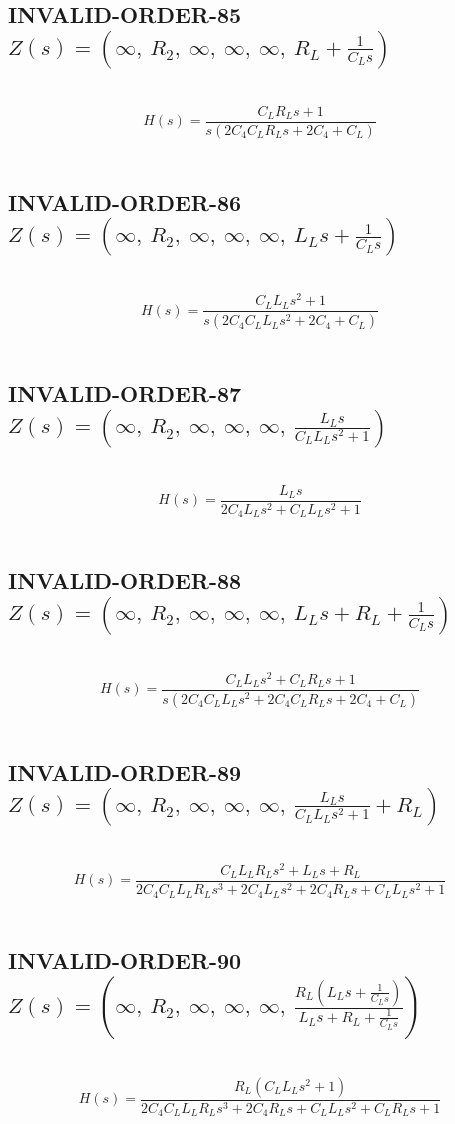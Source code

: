 \documentclass{article}
\begin{document}
\subsection{INVALID-ORDER-85 $Z(s) = \left( \infty, \  R_{2}, \  \infty, \  \infty, \  \infty, \  R_{L} + \frac{1}{C_{L} s}\right)$ } \ 
\textbf{\[H(s) = \frac{C_{L} R_{L} s + 1}{s \left(2 C_{4} C_{L} R_{L} s + 2 C_{4} + C_{L}\right)}\] } \ 
\subsection{INVALID-ORDER-86 $Z(s) = \left( \infty, \  R_{2}, \  \infty, \  \infty, \  \infty, \  L_{L} s + \frac{1}{C_{L} s}\right)$ } \ 
\textbf{\[H(s) = \frac{C_{L} L_{L} s^{2} + 1}{s \left(2 C_{4} C_{L} L_{L} s^{2} + 2 C_{4} + C_{L}\right)}\] } \ 
\subsection{INVALID-ORDER-87 $Z(s) = \left( \infty, \  R_{2}, \  \infty, \  \infty, \  \infty, \  \frac{L_{L} s}{C_{L} L_{L} s^{2} + 1}\right)$ } \ 
\textbf{\[H(s) = \frac{L_{L} s}{2 C_{4} L_{L} s^{2} + C_{L} L_{L} s^{2} + 1}\] } \ 
\subsection{INVALID-ORDER-88 $Z(s) = \left( \infty, \  R_{2}, \  \infty, \  \infty, \  \infty, \  L_{L} s + R_{L} + \frac{1}{C_{L} s}\right)$ } \ 
\textbf{\[H(s) = \frac{C_{L} L_{L} s^{2} + C_{L} R_{L} s + 1}{s \left(2 C_{4} C_{L} L_{L} s^{2} + 2 C_{4} C_{L} R_{L} s + 2 C_{4} + C_{L}\right)}\] } \ 
\subsection{INVALID-ORDER-89 $Z(s) = \left( \infty, \  R_{2}, \  \infty, \  \infty, \  \infty, \  \frac{L_{L} s}{C_{L} L_{L} s^{2} + 1} + R_{L}\right)$ } \ 
\textbf{\[H(s) = \frac{C_{L} L_{L} R_{L} s^{2} + L_{L} s + R_{L}}{2 C_{4} C_{L} L_{L} R_{L} s^{3} + 2 C_{4} L_{L} s^{2} + 2 C_{4} R_{L} s + C_{L} L_{L} s^{2} + 1}\] } \ 
\subsection{INVALID-ORDER-90 $Z(s) = \left( \infty, \  R_{2}, \  \infty, \  \infty, \  \infty, \  \frac{R_{L} \left(L_{L} s + \frac{1}{C_{L} s}\right)}{L_{L} s + R_{L} + \frac{1}{C_{L} s}}\right)$ } \ 
\textbf{\[H(s) = \frac{R_{L} \left(C_{L} L_{L} s^{2} + 1\right)}{2 C_{4} C_{L} L_{L} R_{L} s^{3} + 2 C_{4} R_{L} s + C_{L} L_{L} s^{2} + C_{L} R_{L} s + 1}\] } \ 
\end{document}
